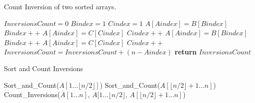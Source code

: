 \begin{homeworkProblem}
    \begin{algorithm}
        \caption{Count Inversion of two sorted arrays.} \label{count_inversion}
        \begin{algorithmic}[1]
            \State$InversionsCount = 0$
            \State$Bindex = 1$
            \State$Cindex = 1$
                 
                    \State $A[Aindex]= B[Bindex]$
                    \State $Bindex++$
                 
                    \State $A[Aindex] = C[Cindex]$
                    \State $Cindex++$
                 
                    \State $A[Aindex] = B[Bindex]$
                    \State $Bindex++$
                \Else {}
                    \State $A[Aindex] = C[Cindex]$
                    \State $Cindex++$
                    \State $InversionsCount = InversionsCount + (n - Aindex)$
                \EndIf
            \EndFor
            \State \textbf{return} $InversionsCount$
            \EndProcedure
        \end{algorithmic}
    \end{algorithm}
    \begin{algorithm}
        \caption{Sort and Count Inversions} \label{sort_and_count}
        \begin{algorithmic}[1]
                \State Sort\_and\_Count($A[1 \ldots \lfloor n/2 \rfloor]$)
                \State Sort\_and\_Count($A[\lfloor n/2 \rfloor + 1 \ldots n]$)
                \State Count\_Inversions($\overline{A}[1 \ldots n]$, $A[1 \ldots \lfloor n/2 \rfloor$, $A[\lfloor n/2 \rfloor + 1 \ldots n]$)
            \EndProcedure
        \end{algorithmic}
    \end{algorithm}
\end{homeworkProblem}
